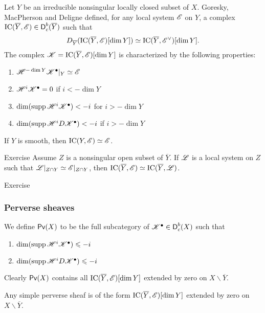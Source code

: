 Let $Y$ be an irreducible nonsingular locally closed subset of $X$. Goresky, 
MacPherson and Deligne defined, for any local system $\mathscr{E}$ on $Y$, a complex 
$\operatorname{IC}(\overline Y,\mathscr{E})\in \operatorname{\mathsf{D}}_c^b(\overline Y)$ such 
that 
\[
  D_{\overline Y}(\operatorname{IC}(\overline Y,\mathscr{E})[\dim Y]) \simeq \operatorname{IC}(\overline Y,\mathscr{E}^\vee)[\dim Y] .
\]
The complex $\mathscr{K}=\operatorname{IC}(\overline Y,\mathscr{E})[\dim Y]$ is 
characterized by the following properties:
\begin{enumerate}
  \item $\mathscr{H}^{-\dim Y} \mathscr{K}^\bullet|_Y \simeq \mathscr{E}$
  \item $\mathscr{H}^i\mathscr{K}^\bullet=0$ if $i<-\dim Y$
  \item $\dim(\operatorname{supp} \mathscr{H}^i\mathscr{K}^\bullet)<-i$ for $i>-\dim Y$
  \item $\dim(\operatorname{supp}\mathscr{H}^i D \mathscr{K}^\bullet) < -i$ if $i>-\dim Y$
\end{enumerate}

If $Y$ is smooth, then $\operatorname{IC}(Y,\mathscr{E}) \simeq \mathscr{E}$. 

\begin{enonce}[remark]{Exercise}
Assume $Z$ is a nonsingular open subset of $\overline Y$. If $\mathscr{L}$ is a local 
system on $Z$ such that $\mathscr{L}|_{Z\cap Y}\simeq \mathscr{E}|_{Z\cap Y}$, then 
$\operatorname{IC}(\overline Y,\mathscr{E}) \simeq \operatorname{IC}(\overline Y,\mathscr{L})$. 
\end{enonce}{Exercise}





\subsubsection{Perverse sheaves}

We define $\operatorname{\mathsf{Pv}}(X)$ to be the full subcategory of 
$\mathscr{K}^\bullet\in \operatorname{\mathsf{D}}_c^b(X)$ such that 
\begin{enumerate}
  \item $\dim(\operatorname{supp} \mathscr{H}^i\mathscr{K}^\bullet) \leqslant -i$ 
  \item $\dim(\operatorname{supp} \mathscr{H}^i D \mathscr{K}^\bullet)\leqslant -i$
\end{enumerate}
Clearly $\operatorname{\mathsf{Pv}}(X)$ contains all $\operatorname{IC}(\overline Y,\mathscr{E})[\dim Y]$ 
extended by zero on $X\smallsetminus \overline Y$. 

\begin{theo}
Any simple perverse sheaf is of the form 
$\operatorname{IC}(\overline Y,\mathscr{E})[\dim Y]$ extended by zero on 
$X\smallsetminus \overline Y$. 
\end{theo}

